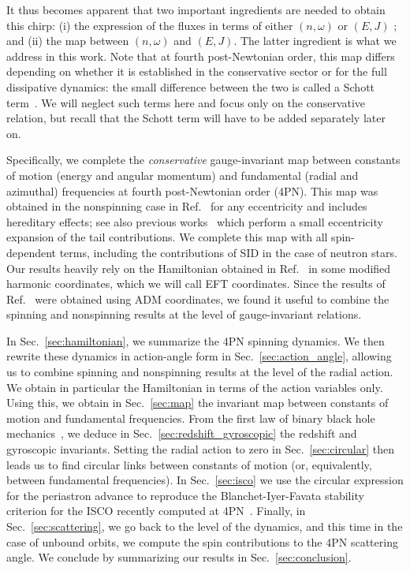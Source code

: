 \documentclass[prd,superscriptaddress,preprintnumbers,tightenlines,nofootinbib, eqsecnum]{revtex4-2}
\begin{document}
It thus becomes apparent that two important ingredients are needed to obtain this chirp: (i) the expression of the fluxes in terms of either $(n,\omega)$ or $(E,J)$ ; and (ii) the map between $(n,\omega)$ and $(E,J)$. The latter ingredient is what we address in this work. Note that at fourth post-Newtonian order, this map differs depending on whether it is established in the conservative sector or for the full dissipative dynamics: the small difference between the two is called a Schott term~\cite{Trestini:2025nzr}. We will neglect such terms here and focus only on the conservative relation, but recall that the Schott term will have to be added separately later on.



Specifically, we complete the \textit{conservative} gauge-invariant map between constants of motion (energy and angular momentum) and fundamental (radial and azimuthal) frequencies at fourth post-Newtonian order (4PN). This map was obtained in the nonspinning case in Ref.~\cite{Trestini:2025yyc} for any eccentricity and includes hereditary effects; see also previous works~\cite{Bini:2020wpo, Bini:2020nsb} which perform a small eccentricity expansion of the tail contributions. We complete this map with all spin-dependent terms, including the contributions of SID in the case of neutron stars. Our results heavily rely on the Hamiltonian obtained in Ref.~\cite{Levi:2016ofk} in some modified harmonic coordinates, which we will call EFT coordinates. Since the results of Ref.~\cite{Trestini:2025yyc} were obtained using ADM coordinates, we found it useful to combine the spinning and nonspinning results at the level of gauge-invariant relations.

In Sec.~\ref{sec:hamiltonian}, we summarize the 4PN spinning dynamics. We then rewrite these dynamics in action-angle form in Sec.~\ref{sec:action_angle}, allowing us to combine spinning and nonspinning results at the level of the radial action. We obtain in particular the Hamiltonian in terms of the action variables only. Using this, we obtain in Sec.~\ref{sec:map} the invariant map between constants of motion and fundamental frequencies. From the first law of binary black hole mechanics~\cite{LeTiec:2011ab,Blanchet:2012at,LeTiec:2015kgg}, we deduce in Sec.~\ref{sec:redshift_gyroscopic} the redshift and gyroscopic invariants. Setting the radial action to zero in Sec.~\ref{sec:circular} then leads us to find circular links between constants of motion (or, equivalently, between fundamental frequencies). In Sec.~\ref{sec:isco} we use the circular expression for the periastron advance to reproduce  the Blanchet-Iyer-Favata stability criterion for the ISCO recently computed at 4PN~\cite{Blanchet:2025agj,Blanchet:2026wwa}. Finally, in Sec.~\ref{sec:scattering}, we go back to the level of the dynamics, and this time in the case of unbound orbits, we compute the spin contributions to the 4PN scattering angle. We conclude by summarizing our results in Sec.~\ref{sec:conclusion}.
\end{document}
